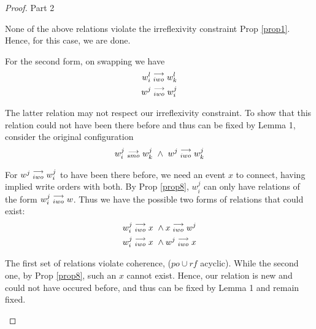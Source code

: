 \begin{proof}{Part 2}
\begin{itemize}
                        None of the above relations violate the irreflexivity constraint Prop \ref{prop1}. Hence, for this case, we are done. 

                        For the second form, on swapping we have 
                        \begin{align*}
                            w_i^l\stackrel{\longrightarrow}{_{iwo}}w_k^l \\ 
                            w^j\stackrel{\longrightarrow}{_{iwo}}w_i^j
                        \end{align*}

                        The latter relation may not respect our irreflexivity constraint. To show that this relation could not have been there before and thus can be fixed by Lemma 1, consider the original configuration
                        \begin{align*}
                            \reln{w_i^j}{smo}{w_k^j} \ \wedge \ \reln{w^j}{iwo}{w_k^j}
                        \end{align*}

                        For $w^j\stackrel{\longrightarrow}{_{iwo}}w_i^j$ to have been there before, we need an event $x$ to connect, having implied write orders with both. By Prop \ref{prop8}, $w_i^j$ can only have relations of the form  $w_i^j\stackrel{\longrightarrow}{_{iwo}}w$. Thus we have the possible two forms of relations that could exist:
                        \begin{align*}
                            w_i^j\stackrel{\longrightarrow}{_{iwo}}x \ \wedge x\stackrel{\longrightarrow}{_{iwo}}w^j \\ 
                            w_i^j\stackrel{\longrightarrow}{_{iwo}}x \ \wedge w^j\stackrel{\longrightarrow}{_{iwo}}x \\ 
                        \end{align*}

                        The first set of relations violate coherence, ($po \cup rf$ acyclic). While the second one, by Prop \ref{prop8}, such an $x$ cannot exist. Hence, our relation is new and could not have occured before, and thus can be fixed by Lemma 1 and remain fixed.

                \end{itemize}

            
        \end{proof}
   